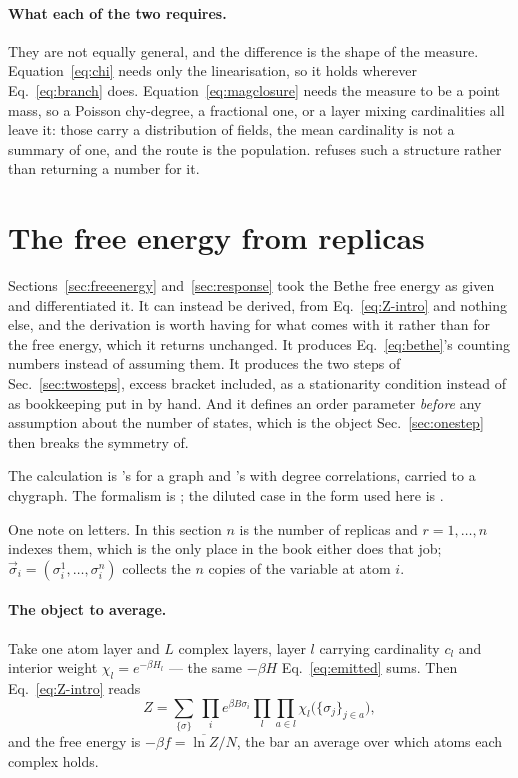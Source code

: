 \paragraph{What each of the two requires.} They are not equally general, and
the difference is the shape of the measure. Equation~\eqref{eq:chi} needs only
the linearisation, so it holds wherever Eq.~\eqref{eq:branch} does.
Equation~\eqref{eq:magclosure} needs the measure to be a point mass, so a
Poisson chy-degree, a fractional one, or a layer mixing cardinalities all leave
it: those carry a distribution of fields, the mean cardinality is not a summary
of one, and the route is the population.  refuses such a structure rather than returning a number for it.

\section{The free energy from replicas}
\label{sec:replicas-chy}

Sections~\ref{sec:freeenergy} and~\ref{sec:response} took the Bethe free energy
as given and differentiated it. It can instead be derived, from
Eq.~\eqref{eq:Z-intro} and nothing else, and the derivation is worth having for
what comes with it rather than for the free energy, which it returns unchanged.
It produces Eq.~\eqref{eq:bethe}'s counting numbers instead of assuming them.
It produces the two steps of Sec.~\ref{sec:twosteps}, excess bracket included,
as a stationarity condition instead of as bookkeeping put in by hand. And it
defines an order parameter \emph{before} any assumption about the number of
states, which is the object Sec.~\ref{sec:onestep} then breaks the symmetry of.

The calculation is \citet{leone2002}'s for a graph and
\citet{vazquez2003vw}'s with degree correlations, carried to a chygraph. The
formalism is \citet{mezard1987}; the diluted case in the form used here is
\citet{franz2003}.

One note on letters. In this section $n$ is the number of replicas and
$r=1,\dots,n$ indexes them, which is the only place in the book either does
that job; $\vec\sigma_{i}=(\sigma^{1}_{i},\dots,\sigma^{n}_{i})$ collects the
$n$ copies of the variable at atom $i$.

\paragraph{The object to average.} Take one atom layer and $L$ complex layers,
layer $l$ carrying cardinality $c_{l}$ and interior weight
$\chi_{l}=e^{-\beta H_{l}}$ --- the same $-\beta H$ Eq.~\eqref{eq:emitted} sums.
Then Eq.~\eqref{eq:Z-intro} reads
\begin{equation}
  Z=\sum_{\{\sigma\}}\ \prod_{i}e^{\beta B\sigma_{i}}
    \prod_{l}\prod_{a\in l}\chi_{l}\bigl(\{\sigma_{j}\}_{j\in a}\bigr),
  \label{eq:Zchy}
\end{equation}
and the free energy is $-\beta f=\overline{\ln Z}/N$, the bar an average over
which atoms each complex holds.

